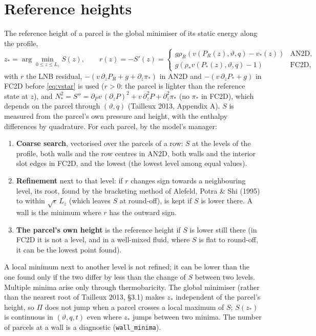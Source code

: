 \documentclass[11pt,a4paper]{article}
\newcommand{\vt}{\vartheta}
\newcommand{\code}[1]{\texttt{#1}}
\newcommand{\zs}{z_{*}}
\begin{document}
\section{Reference heights}\label{sec:lnb}
The reference height of a parcel is the global minimiser of its static energy along the profile,
\begin{equation}
  \zs=\arg\min_{0\le z\le L_z}S(z),\qquad
  r(z)=-S'(z)=\begin{cases}
    g\rho_R\left(v(P_R(z),\vt,q)-v_*(z)\right) & \text{AN2D},\\[2pt]
    g\left(\rho_*v(P_*(z),\vt,q)-1\right) & \text{FC2D},
  \end{cases}
  \label{eq:zstar}
\end{equation}
with $r$ the LNB residual, $-(v\,\partial_zP_R+g+\partial_z\pi_*)$ in AN2D and $-(v\,\partial_zP_*+g)$ in FC2D before
\eqref{eq:vstar} is used ($r>0$: the parcel is lighter than the reference state at $z$), and
$N_*^2=S''=\partial_Pv\,(\partial_zP)^2+v\,\partial_z^2P+\partial_z^2\pi_*$ (no $\pi_*$ in FC2D), which depends on the parcel
through $(\vt,q)$ (Tailleux 2013, Appendix A). $S$ is measured from the parcel's own pressure and height, with the enthalpy
differences by quadrature. For each parcel, by the model's manager:
\begin{enumerate}
  \item \textbf{Coarse search}, vectorised over the parcels of a row: $S$ at the levels of the profile, both walls and the
        row centres in AN2D, both walls and the interior slot edges in FC2D, and the lowest (the lowest level among equal
        values).
  \item \textbf{Refinement} next to that level: if $r$ changes sign towards a neighbouring level, its root, found by the
        bracketing method of Alefeld, Potra \& Shi (1995) to within $\sqrt\epsilon\,L_z$ (which leaves $S$ at round-off), is
        kept if $S$ is lower there. A wall is the minimum where $r$ has the outward sign.
  \item \textbf{The parcel's own height} is the reference height if $S$ is lower still there (in FC2D it is not a level, and
        in a well-mixed fluid, where $S$ is flat to round-off, it can be the lowest point found).
\end{enumerate}
A local minimum next to another level is not refined; it can be lower than the one found only if the two differ by less than
the change of $S$ between two levels. Multiple minima arise only through thermobaricity. The global minimiser (rather than
the nearest root of Tailleux 2013, \S3.1) makes $\zs$ independent of the parcel's height, so $\Pi$ does not jump when a parcel
crosses a local maximum of $S$; $S(\zs)$ is continuous in $(\vt,q,t)$ even where $\zs$ jumps between two minima. The number of
parcels at a wall is a diagnostic (\code{wall\_minima}).
\end{document}
